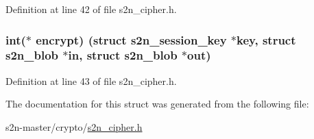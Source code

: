 Definition at line 42 of file s2n\+\_\+cipher.\+h.

\subsubsection[{\texorpdfstring{encrypt}{encrypt}}]{\setlength{\rightskip}{0pt plus 5cm}int($\ast$ encrypt) (struct {\bf s2n\+\_\+session\+\_\+key} $\ast$key, struct {\bf s2n\+\_\+blob} $\ast$in, struct {\bf s2n\+\_\+blob} $\ast$out)}\hypertarget{structs2n__stream__cipher_a877aa5eb78a3137b4968ed5280e2b9a3}{}\label{structs2n__stream__cipher_a877aa5eb78a3137b4968ed5280e2b9a3}


Definition at line 43 of file s2n\+\_\+cipher.\+h.



The documentation for this struct was generated from the following file\+:\begin{DoxyCompactItemize}
\item 
s2n-\/master/crypto/\hyperlink{s2n__cipher_8h}{s2n\+\_\+cipher.\+h}\end{DoxyCompactItemize}
